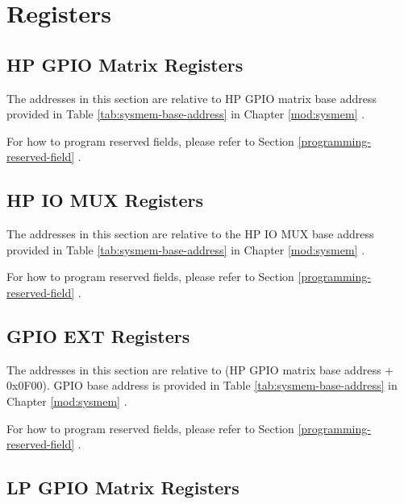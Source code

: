 \documentclass[main\_\_EN.tex]{subfiles}
\begin{document}


\section{Registers}

\subsection{HP GPIO Matrix Registers}
The addresses in this section are relative to HP GPIO matrix base address provided in Table \ref{tab:sysmem-base-address} in Chapter \ref{mod:sysmem} \textit{}.

For how to program reserved fields, please refer to Section \ref{programming-reserved-field} \textit{}.



\subsection{HP IO MUX Registers}

The addresses in this section are relative to the HP IO MUX base address provided in Table \ref{tab:sysmem-base-address} in Chapter \ref{mod:sysmem} \textit{}.

For how to program reserved fields, please refer to Section \ref{programming-reserved-field} \textit{}.



\subsection{GPIO EXT Registers}

The addresses in this section are relative to (HP GPIO matrix base address + 0x0F00). GPIO base address is provided in Table \ref{tab:sysmem-base-address} in Chapter \ref{mod:sysmem} \textit{}.

For how to program reserved fields, please refer to Section \ref{programming-reserved-field} \textit{}.



\subsection{LP GPIO Matrix Registers}
\end{document}
